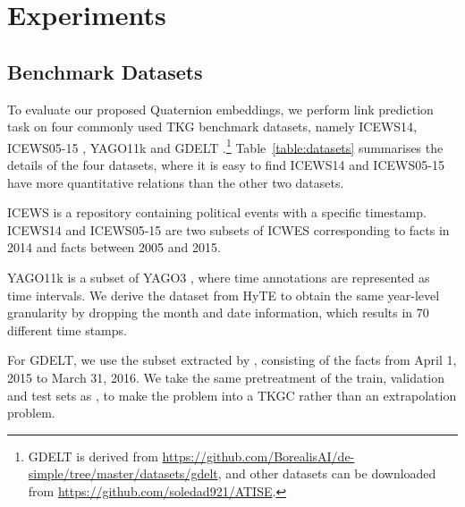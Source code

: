 \documentclass[11pt]{article}
\begin{document}
\section{Experiments}

\subsection{Benchmark Datasets}\label{section_datasets}
To evaluate our proposed Quaternion embeddings, we perform link prediction task on four commonly used TKG benchmark datasets, namely {ICEWS14}, {ICEWS05-15} \cite{garcia2018learning}, {YAGO11k} \cite{dasgupta2018hyte} and {GDELT} \cite{trivedi2017know}.\footnote{GDELT is derived from \url{https://github.com/BorealisAI/de-simple/tree/master/datasets/gdelt}, and other datasets can be downloaded from \url{https://github.com/soledad921/ATISE}.}
Table~\ref{table:datasets} summarises the details of the four datasets, where it is easy to find ICEWS14 and ICEWS05-15 have more quantitative relations than the other two datasets.

ICEWS \cite{lautenschlager2015icews} is a repository containing political events with a specific timestamp.
ICEWS14 and ICEWS05-15 \cite{garcia2018learning} are two subsets of ICWES corresponding to facts in 2014 and facts between 2005 and 2015.

YAGO11k \cite{dasgupta2018hyte} is a subset of YAGO3 \cite{Mahdisoltani2015YAGO3AK}, where time annotations are represented as time intervals.
We derive the dataset from HyTE \cite{dasgupta2018hyte} to obtain the same year-level granularity by dropping the month and date information, which results in 70 different time stamps.

For GDELT, we use the subset extracted by \citeauthor{trivedi2017know}, consisting of the facts from April 1, 2015 to March 31, 2016.
We take the same pretreatment of the train, validation and test sets as  \cite{goel2020diachronic}, to make the
problem into a TKGC rather than an extrapolation problem.
\end{document}
